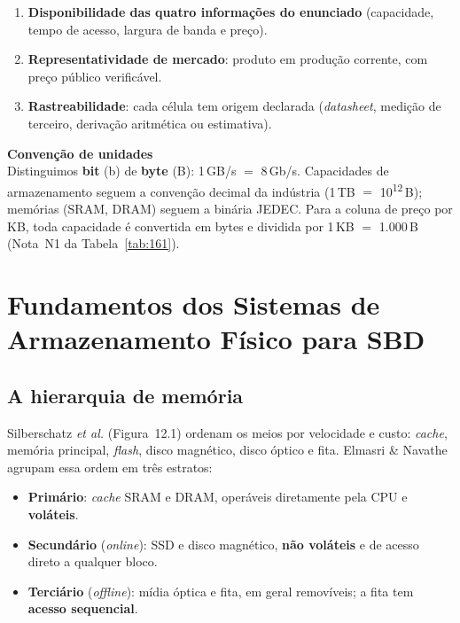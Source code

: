 \documentclass[11pt,a4paper]{article}
\newcommand{\destaque}[2]{%
  \begin{center}\begin{minipage}{0.97\textwidth}
  \colorbox{fundo}{\begin{minipage}{\dimexpr\linewidth-2\fboxsep}
  \vspace{3pt}\textbf{\color{azul}#1}\\[2pt]\small #2\vspace{3pt}
  \end{minipage}}\end{minipage}\end{center}}
\begin{document}
\begin{enumerate}[label=\textbf{C\arabic*.}]
\item \textbf{Disponibilidade das quatro informações do enunciado} (capacidade, tempo de
      acesso, largura de banda e preço).
\item \textbf{Representatividade de mercado}: produto em produção corrente, com preço
      público verificável.
\item \textbf{Rastreabilidade}: cada célula tem origem declarada (\emph{datasheet}, medição
      de terceiro, derivação aritmética ou estimativa).
\end{enumerate}

\destaque{Convenção de unidades}{%
Distinguimos \textbf{bit} (b) de \textbf{byte} (B): 1\,GB/s $=$ 8\,Gb/s. Capacidades de
armazenamento seguem a convenção decimal da indústria (1\,TB $=$ 10\textsuperscript{12}\,B);
memórias (SRAM, DRAM) seguem a binária JEDEC. Para a coluna de preço por KB, toda capacidade
é convertida em bytes e dividida por 1\,KB $=$ 1.000\,B (Nota~N1 da Tabela~\ref{tab:161}).}

\section{Fundamentos dos Sistemas de Armazenamento Físico para SBD}

\subsection{A hierarquia de memória}

Silberschatz \emph{et al.} (Figura~12.1) ordenam os meios por velocidade e custo:
\emph{cache}, memória principal, \emph{flash}, disco magnético, disco óptico e fita. Elmasri
\& Navathe agrupam essa ordem em três estratos:

\begin{itemize}
\item \textbf{Primário}: \emph{cache} SRAM e DRAM, operáveis diretamente pela CPU e
      \textbf{voláteis}.
\item \textbf{Secundário} (\emph{online}): SSD e disco magnético, \textbf{não voláteis} e de
      acesso direto a qualquer bloco.
\item \textbf{Terciário} (\emph{offline}): mídia óptica e fita, em geral removíveis; a fita
      tem \textbf{acesso sequencial}.
\end{itemize}
\end{document}
